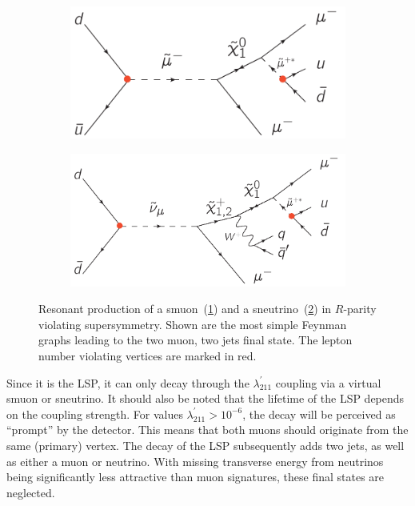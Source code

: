 \begin{figure}[ht!]
  \centering
  \begin{subfigure}[b]{0.495\textwidth}
    \centering
    \includegraphics[width=\textwidth]{plots/rpv-resonant-smuon-samesign-mumuqq.pdf}
    \caption{\label{fig:ressmu}}
  \end{subfigure}
  \begin{subfigure}[b]{0.495\textwidth}
    \centering
    \includegraphics[width=\textwidth]{plots/rpv-resonant-sneutrino-chargino-mumuqq.pdf}
    \caption{\label{fig:ressneu}}
  \end{subfigure}
  \caption{Resonant production of a smuon~(\ref{fig:ressmu}) and a sneutrino~(\ref{fig:ressneu}) in $R$-parity violating supersymmetry. Shown are the most simple Feynman graphs leading to the two muon, two jets final state. The lepton number violating vertices are marked in red.}
  \label{fig:resosmusneu}
\end{figure}


Since it is the LSP, it can only decay through the $\lambda^\prime_{211}$ coupling via a virtual smuon or sneutrino. It should also be noted that the lifetime of the LSP depends on the coupling strength. For values $\lambda^\prime_{211} > 10^{-6}$, the decay will be perceived as ``prompt'' by the detector. This means that both muons should originate from the same (primary) vertex. The decay of the LSP subsequently adds two jets, as well as either a muon or neutrino. With missing transverse energy from neutrinos being significantly less attractive than muon signatures, these final states are neglected. 


